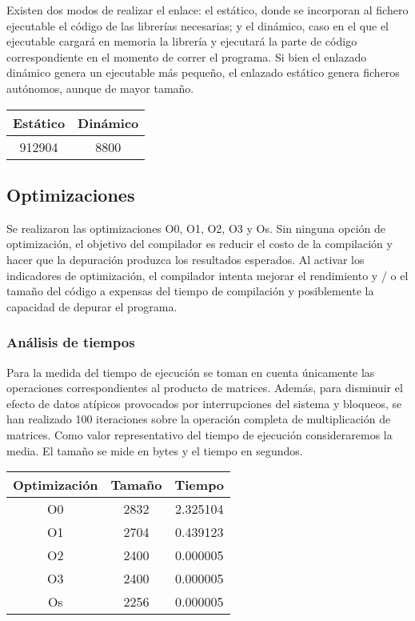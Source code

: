 \documentclass[10pt,a4paper]{article}
\begin{document}
Existen dos modos de realizar el enlace: el estático, donde se incorporan al fichero ejecutable el código de las librerías necesarias; y el dinámico, caso en el que el ejecutable cargará en memoria la librería y ejecutará la parte de código correspondiente en el momento de correr el programa. Si bien el enlazado dinámico genera un ejecutable más pequeño, el enlazado estático genera ficheros autónomos, aunque de mayor tamaño.
\begin{center}
\begin{tabular}{c|c} 
\rule[-1ex]{0pt}{2.5ex} \textbf{Estático} & \textbf{Dinámico} \\ 
\hline 
\rule[-1ex]{0pt}{2.5ex} 912904 & 8800 \\ 
\end{tabular}  

\end{center}

\subsection{Optimizaciones}
Se realizaron las optimizaciones O0, O1, O2, O3 y Os. Sin ninguna opción de optimización, el objetivo del compilador es reducir el costo de la compilación y hacer que la depuración produzca los resultados esperados. Al activar los indicadores de optimización, el compilador intenta mejorar el rendimiento y / o el tamaño del código a expensas del tiempo de compilación y posiblemente la capacidad de depurar el programa.

\subsubsection{Análisis de tiempos}
Para la medida del tiempo de ejecución se toman en cuenta únicamente las operaciones correspondientes al producto de matrices. Además, para disminuir el efecto de datos atípicos provocados por interrupciones del sistema y bloqueos, se han realizado 100 iteraciones sobre la operación completa de multiplicación de matrices. Como valor representativo del tiempo de ejecución consideraremos la media.  El tamaño se mide en bytes y el tiempo en segundos. 
\begin{center}

\begin{tabular}{|c|c|c|}
\hline 
\textbf{Optimización} & \textbf{Tamaño} & \textbf{Tiempo} \\ 
\hline 
O0 & 2832 & 2.325104
 \\ 
\hline 
O1 & 2704 & 0.439123
 \\ 
\hline 
O2 & 2400 & 0.000005
 \\ 
\hline 
O3 & 2400 & 0.000005 \\  	
\hline 
Os & 2256 & 0.000005
 \\ 
\hline 
\end{tabular} 
\end{center}
\end{document}
